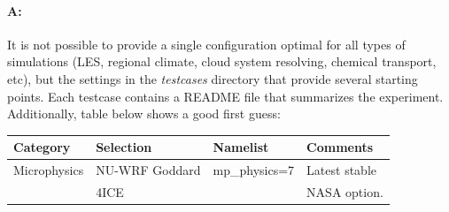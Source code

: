 \paragraph{A:} It is not possible to provide a single configuration optimal for
all types of simulations (LES, regional climate, cloud system resolving, 
chemical transport, etc), but the settings in the \emph{testcases} directory
that provide several starting points. Each testcase contains a README file 
that summarizes the experiment. Additionally, table below shows a good first guess:
\\

\begin{tabular}{|l|l|l|l|} \hline
Category     & Selection     & Namelist           & Comments             \\ \hline
Microphysics & NU-WRF Goddard& mp\_physics=7     & Latest stable        \\
             & 4ICE          &                    & NASA option.         \\ \hline


\end{tabular}
